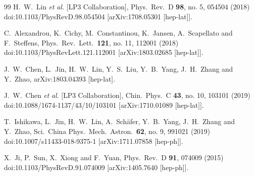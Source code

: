 \begin{thebibliography}{99}
  H.~W.~Lin {\it et al.} [LP3 Collaboration],
  Phys.\ Rev.\ D {\bf 98}, no. 5, 054504 (2018)
  doi:10.1103/PhysRevD.98.054504
  [arXiv:1708.05301 [hep-lat]].


  C.~Alexandrou, K.~Cichy, M.~Constantinou, K.~Jansen, A.~Scapellato and F.~Steffens,
  Phys.\ Rev.\ Lett.\  {\bf 121}, no. 11, 112001 (2018)
  doi:10.1103/PhysRevLett.121.112001
  [arXiv:1803.02685 [hep-lat]].


  J.~W.~Chen, L.~Jin, H.~W.~Lin, Y.~S.~Liu, Y.~B.~Yang, J.~H.~Zhang and Y.~Zhao,
  arXiv:1803.04393 [hep-lat].


  J.~W.~Chen {\it et al.} [LP3 Collaboration],
  Chin.\ Phys.\ C {\bf 43}, no. 10, 103101 (2019)
  doi:10.1088/1674-1137/43/10/103101
  [arXiv:1710.01089 [hep-lat]].


  T.~Ishikawa, L.~Jin, H.~W.~Lin, A.~Sch\"afer, Y.~B.~Yang, J.~H.~Zhang and Y.~Zhao,
  Sci.\ China Phys.\ Mech.\ Astron.\  {\bf 62}, no. 9, 991021 (2019)
  doi:10.1007/s11433-018-9375-1
  [arXiv:1711.07858 [hep-ph]].


  X.~Ji, P.~Sun, X.~Xiong and F.~Yuan,
  Phys.\ Rev.\ D {\bf 91}, 074009 (2015)
  doi:10.1103/PhysRevD.91.074009
  [arXiv:1405.7640 [hep-ph]].



\end{thebibliography}
